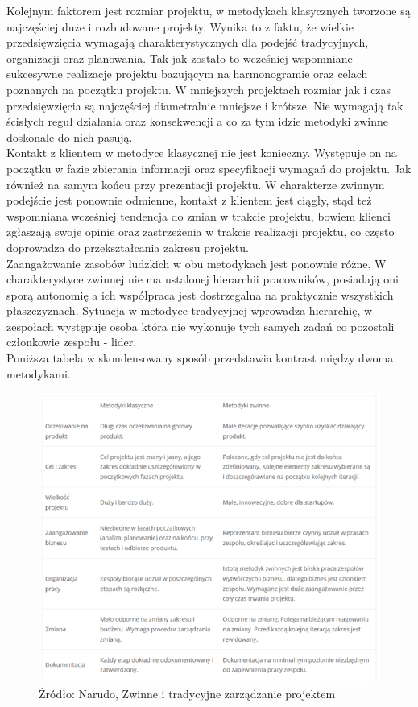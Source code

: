 \documentclass[oneside,polski,logo]{amuthesis}
\begin{document}
Kolejnym faktorem jest rozmiar projektu, w metodykach klasycznych tworzone są najczęściej duże i rozbudowane projekty. Wynika to z faktu, że wielkie przedsięwzięcia wymagają charakterystycznych dla podejść tradycyjnych, organizacji oraz planowania. Tak jak zostało to wcześniej wspomniane sukcesywne realizacje projektu bazującym na harmonogramie oraz celach poznanych na początku projektu. W mniejszych projektach rozmiar jak i czas przedsięwzięcia są najczęściej diametralnie mniejsze i krótsze. Nie wymagają tak ścisłych reguł działania oraz konsekwencji a co za tym idzie metodyki zwinne doskonale do nich pasują.\\

Kontakt z klientem w metodyce klasycznej nie jest konieczny. Występuje on na początku w fazie zbierania informacji oraz specyfikacji wymagań do projektu. Jak również na samym końcu przy prezentacji projektu. W charakterze zwinnym podejście jest ponownie odmienne, kontakt z klientem jest ciągły, stąd też wspomniana wcześniej tendencja do zmian w trakcie projektu, bowiem klienci zgłaszają swoje opinie oraz zastrzeżenia w trakcie realizacji projektu, co często doprowadza do przekształcania zakresu projektu.\\

Zaangażowanie zasobów ludzkich w obu metodykach jest ponownie różne. W charakterystyce zwinnej nie ma ustalonej hierarchii pracowników, posiadają oni sporą autonomię a ich współpraca jest dostrzegalna na praktycznie wszystkich płaszczyznach. Sytuacja w metodyce tradycyjnej wprowadza hierarchię, w zespołach występuje osoba która nie wykonuje tych samych zadań co pozostali członkowie zespołu - lider. \cite{modele}\cite{agileVwaterfall}\\

Poniższa tabela w skondensowany sposób przedstawia kontrast między dwoma metodykami.\\

\begin{figure}[h]
	\centering
	\includegraphics[width=15cm]{images/hyps/zwinne-tradycyjne.png}
	\caption{Źródło: Narudo, Zwinne i tradycyjne zarządzanie projektem}
\end{figure}
\end{document}
